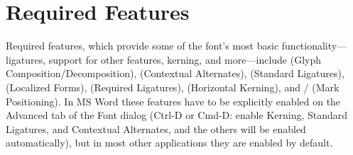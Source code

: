\section{Required Features}\hypertarget{req}{}%
Required features, which provide some of the font’s most basic functionality—ligatures, support for
other features, kerning, and more—include  (Glyph Composition/Decomposition),
 (Contextual Alternates),  (Standard Ligatures),
 (Localized Forms),  (Required Ligatures),
 (Horizontal Kerning), and / (Mark
Positioning). In MS Word these features have to be explicitly enabled on the Advanced tab of the Font dialog (Ctrl-D or
Cmd-D: enable Kerning, Standard Ligatures, and Contextual Alternates, and the others will be enabled automatically),
but in most other applications they are enabled by default.










